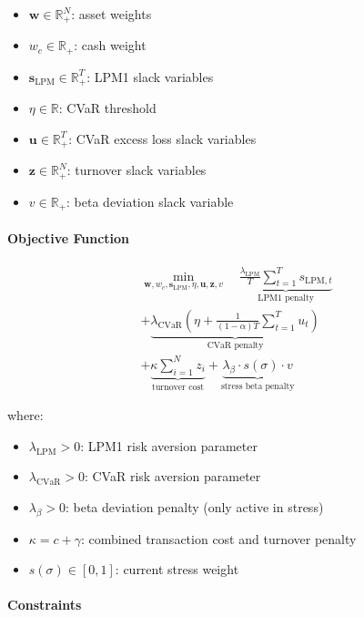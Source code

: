 \begin{itemize}
  \item $\mathbf{w} \in \mathbb{R}^N_+$: asset weights
  \item $w_c \in \mathbb{R}_+$: cash weight
  \item $\mathbf{s}_{\text{LPM}} \in \mathbb{R}^T_+$: LPM1 slack variables
  \item $\eta \in \mathbb{R}$: CVaR threshold
  \item $\mathbf{u} \in \mathbb{R}^T_+$: CVaR excess loss slack variables
  \item $\mathbf{z} \in \mathbb{R}^N_+$: turnover slack variables
  \item $v \in \mathbb{R}_+$: beta deviation slack variable
\end{itemize}

\paragraph{Objective Function}

\begin{multline*}
\min_{\mathbf{w}, w_c, \mathbf{s}_{\text{LPM}}, \eta, \mathbf{u}, \mathbf{z}, v} \quad
\underbrace{\frac{\lambda_{\text{LPM}}}{T} \sum_{t=1}^T s_{\text{LPM}, t}}_{\text{LPM1 penalty}} \\
+ \underbrace{\lambda_{\text{CVaR}} \left( \eta + \frac{1}{(1-\alpha) T} \sum_{t=1}^T u_t \right)}_{\text{CVaR penalty}} \\
+ \underbrace{\kappa \sum_{i=1}^N z_i}_{\text{turnover cost}}
+ \underbrace{\lambda_\beta \cdot s(\sigma) \cdot v}_{\text{stress beta penalty}}
\end{multline*}

where:
\begin{itemize}
  \item[] $\lambda_{\text{LPM}} > 0$: LPM1 risk aversion parameter
  \item[] $\lambda_{\text{CVaR}} > 0$: CVaR risk aversion parameter
  \item[] $\lambda_\beta > 0$: beta deviation penalty (only active in stress)
  \item[] $\kappa = c + \gamma$: combined transaction cost and turnover penalty
  \item[] $s(\sigma) \in [0, 1]$: current stress weight
\end{itemize}

\paragraph{Constraints}


